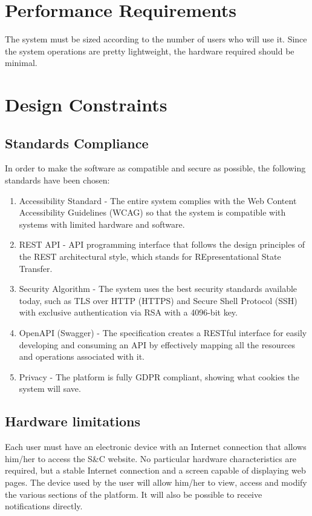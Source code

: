 \section{Performance Requirements}
The system must be sized according to the number of users who will use it. Since the system operations are pretty lightweight, the hardware required should be minimal.

\section{Design Constraints}
\subsection{Standards Compliance}
In order to make the software as compatible and secure as possible, the following standards have been chosen: 
\begin{enumerate}
    \item Accessibility Standard - The entire system complies with the Web Content Accessibility Guidelines (WCAG) so that the system is compatible with systems with limited hardware and software.
    \item REST API - API programming interface that follows the design principles of the REST architectural style, which stands for REpresentational State Transfer.
    \item Security Algorithm - The system uses the best security standards available today, such as TLS over HTTP (HTTPS) and Secure Shell Protocol (SSH) with exclusive authentication via RSA with a 4096-bit key.
    \item OpenAPI (Swagger) -  The specification creates a RESTful interface for easily developing and consuming an API by effectively mapping all the resources and operations associated with it.
    \item Privacy - The platform is fully GDPR compliant, showing what cookies the system will save.
\end{enumerate}


\subsection{Hardware limitations}
Each user must have an electronic device with an Internet connection that allows him/her to access the S\&C website. No particular hardware characteristics are required, but a stable Internet connection and a screen capable of displaying web pages. The device used by the user will allow him/her to view, access and modify the various sections of the platform. It will also be possible to receive notifications directly.
